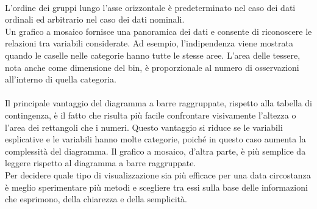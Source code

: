 \documentclass[drafts, 10pt]{book}
\begin{document}
\\
L'ordine dei gruppi lungo l'asse orizzontale è predeterminato nel caso dei dati ordinali ed arbitrario nel caso dei dati nominali.
\\
Un grafico a mosaico fornisce una panoramica dei dati e consente di riconoscere le relazioni tra variabili considerate. Ad esempio, l'indipendenza viene mostrata quando le caselle nelle categorie hanno tutte le stesse aree. L'area delle tessere, nota anche come dimensione del bin, è proporzionale al numero di osservazioni all'interno di quella categoria.
\\
\\
Il principale vantaggio del diagramma a barre raggruppate, rispetto alla tabella di contingenza, è il fatto che risulta più facile confrontare visivamente l'altezza o l'area dei rettangoli che i numeri.  Questo vantaggio si riduce se le variabili esplicative e le variabili hanno molte categorie, poiché in questo caso aumenta la complessità del diagramma. Il grafico a mosaico, d'altra parte, è più semplice da leggere rispetto al diagramma a barre raggruppate.
\\
Per decidere quale tipo di visualizzazione sia più efficace per una data circostanza è meglio sperimentare più metodi e scegliere tra essi sulla base delle informazioni che esprimono, della chiarezza e della semplicità.
\end{document}
